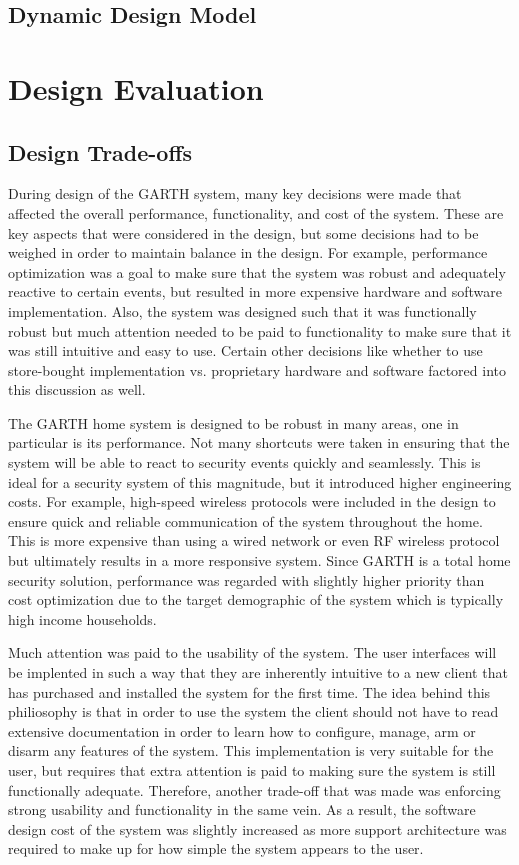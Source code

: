 \documentclass{report}
\begin{document}
\section{Dynamic Design Model}

\chapter{Design Evaluation} %
\label{ch:design-evaluation}

\section{Design Trade-offs}

During design of the GARTH system, many key decisions were made that affected
the overall performance, functionality, and cost of the system. These are key
aspects that were considered in the design, but some decisions had to be
weighed in order to maintain balance in the design. For example, performance
optimization was a goal to make sure that the system was robust and adequately
reactive to certain events, but resulted in more expensive hardware and software
implementation. Also, the system was designed such that it was functionally
robust but much attention needed to be paid to functionality to make sure that
it was still intuitive and easy to use. Certain other decisions like whether to
use store-bought implementation vs. proprietary hardware and software factored
into this discussion as well.

The GARTH home system is designed to be robust in many areas, one in particular
is its performance. Not many shortcuts were taken in ensuring that the system
will be able to react to security events quickly and seamlessly. This is ideal
for a security system of this magnitude, but it introduced higher engineering
costs. For example, high-speed wireless protocols were included in the design
to ensure quick and reliable communication of the system throughout the home.
This is more expensive than using a wired network or even RF wireless protocol
but ultimately results in a more responsive system. Since GARTH is a total home
security solution, performance was regarded with slightly higher priority than
cost optimization due to the target demographic of the system which is typically
high income households.

Much attention was paid to the usability of the system. The user interfaces will
be implented in such a way that they are inherently intuitive to a new client
that has purchased and installed the system for the first time. The idea behind
this philiosophy is that in order to use the system the client should not have 
to read extensive documentation in order to learn how to configure, manage,
arm or disarm any features of the system. This implementation is very suitable
for the user, but requires that extra attention is paid to making sure the system
is still functionally adequate. Therefore, another trade-off that was made was
enforcing strong usability and functionality in the same vein. As a result, the
software design cost of the system was slightly increased as more support 
architecture was required to make up for how simple the system appears to the
user.
\end{document}
